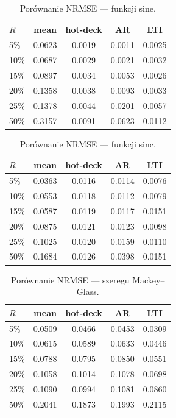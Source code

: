 \begin{table}[htbp]
  \centering
  \caption{Porównanie NRMSE --- funkcji sine.}
  \label{tab:rule01-sine}
  \begin{tabular}{lcccc}
    \hline
    $R$ & mean & hot-deck & AR & LTI \\
    \hline
    5\% & 0.0623 & 0.0019 & 0.0011 & 0.0025 \\
    10\% & 0.0687 & 0.0029 & 0.0021 & 0.0032 \\
    15\% & 0.0897 & 0.0034 & 0.0053 & 0.0026 \\
    20\% & 0.1358 & 0.0038 & 0.0093 & 0.0033 \\
    25\% & 0.1378 & 0.0044 & 0.0201 & 0.0057 \\
    50\% & 0.3157 & 0.0091 & 0.0623 & 0.0112 \\
    \hline
  \end{tabular}
\end{table}

\begin{table}[htbp]
  \centering
  \caption{Porównanie NRMSE --- funkcji sinc.}
  \label{tab:rule01-sinc}
  \begin{tabular}{lcccc}
    \hline
    $R$ & mean & hot-deck & AR & LTI \\
    \hline
    5\% & 0.0363 & 0.0116 & 0.0114 & 0.0076 \\
    10\% & 0.0553 & 0.0118 & 0.0112 & 0.0079 \\
    15\% & 0.0587 & 0.0119 & 0.0117 & 0.0151 \\
    20\% & 0.0875 & 0.0121 & 0.0123 & 0.0098 \\
    25\% & 0.1025 & 0.0120 & 0.0159 & 0.0110 \\
    50\% & 0.1684 & 0.0126 & 0.0398 & 0.0151 \\
    \hline
  \end{tabular}
\end{table}

\begin{table}[htbp]
  \centering
  \caption{Porównanie NRMSE --- szeregu Mackey--Glass.}
  \label{tab:rule01-mackey}
  \begin{tabular}{lcccc}
    \hline
    $R$ & mean & hot-deck & AR & LTI \\
    \hline
    5\% & 0.0509 & 0.0466 & 0.0453 & 0.0309 \\
    10\% & 0.0615 & 0.0589 & 0.0633 & 0.0446 \\
    15\% & 0.0788 & 0.0795 & 0.0850 & 0.0551 \\
    20\% & 0.1058 & 0.1014 & 0.1078 & 0.0698 \\
    25\% & 0.1090 & 0.0994 & 0.1081 & 0.0860 \\
    50\% & 0.2041 & 0.1873 & 0.1993 & 0.2115 \\
    \hline
  \end{tabular}
\end{table}

